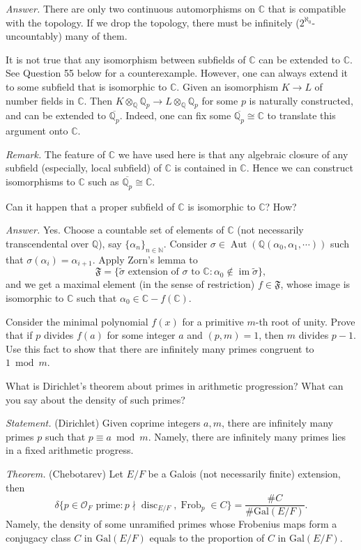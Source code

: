 \documentclass{mathproblems}
\newcommand\C{\mathbb{C}}
\newcommand\OO{\mathcal{O}}
\newcommand\Q{\mathbb{Q}}
\newcommand\Gal{\mathrm{Gal}}
\DeclareMathOperator{\disc}{disc}
\DeclareMathOperator{\Aut}{Aut}
\begin{document}
\begin{questions}
\textit{Answer.} There are only two continuous automorphisms on $\C$ that is compatible with the topology. If we drop the topology, there must be infinitely ($2^{\aleph_0}$-uncountably) many of them.

It is not true that any isomorphism between subfields of $\C$ can be extended to $\C$. See Question 55 below for a counterexample. However, one can always extend it to some subfield that is isomorphic to $\C$. Given an isomorphism $K\to L$ of number fields in $\C$. Then $K\otimes_{\Q}\Q_p\to L\otimes_{\Q}\Q_p$ for some $p$ is naturally constructed, and can be extended to $\overline{\Q_p}$. Indeed, one can fix some $\overline{\Q_p}\cong \C$ to translate this argument onto $\C$.

\textit{Remark.} The feature of $\C$ we have used here is that any algebraic closure of any subfield (especially, local subfield) of $\C$ is contained in $\C$. Hence we can construct isomorphisms to $\C$ such as $\overline{\Q_p} \cong \C$.


\miquestion
{\color{blue} Can it happen that a proper subfield of $\mathbb{C}$ is isomorphic to $\mathbb{C}$? How?}

\textit{Answer.} Yes. Choose a countable set of elements of $\C$ (not necessarily transcendental over $\Q$), say $\{\alpha_n\}_{n\in \mathbb{N}}$. Consider $\sigma\in \Aut(\Q(\alpha_0,\alpha_1,\cdots))$ such that $\sigma(\alpha_i)=\alpha_{i+1}$. Apply Zorn's lemma to
$$
\mathfrak{F}=\{\widetilde{\sigma} \text{ extension of } \sigma \text{ to } \C: \alpha_0\notin \operatorname{im} \widetilde{\sigma}\},
$$
and we get a maximal element (in the sense of restriction) $f\in \mathfrak{F}$, whose image is isomorphic to $\C$ such that $\alpha_0\in \C-f(\C)$.

\miquestion
{\color{blue} Consider the minimal polynomial $f(x)$ for a primitive $m$-th root of unity. Prove that if $p$ divides $f(a)$ for some integer $a$ and $(p, m)=1$, then $m$ divides $p-1$. Use this fact to show that there are infinitely many primes congruent to $1 \bmod m$.}

\miquestion
{\color{blue}
What is Dirichlet's theorem about primes in arithmetic progression? What can you say about the density of such primes?}

\textit{Statement.} (Dirichlet) Given coprime integers $a,m$, there are infinitely many primes $p$ such that $p\equiv a\bmod m$. Namely, there are infinitely many primes lies in a fixed arithmetic progress.

{\color{violet}
\textit{Theorem.} (Chebotarev) Let $E/F$ be a Galois (not necessarily finite) extension, then 
$$
\delta\{p\in \OO_F \text{ prime}: p\nmid \disc_{E/F}, \operatorname{Frob}_p\in C\}=\frac{\#C}{\#\Gal(E/F)}.
$$
Namely, the density of some unramified primes whose Frobenius maps form a conjugacy class $C$ in $\Gal(E/F)$ equals to the proportion of $C$ in $\Gal(E/F)$.
}


\end{questions}
\end{document}
